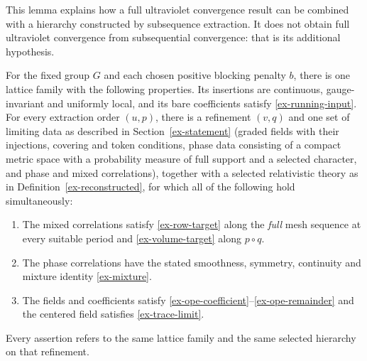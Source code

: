 This lemma explains how a full ultraviolet convergence result can be combined
with a hierarchy constructed by subsequence extraction. It does not obtain
full ultraviolet convergence from subsequential convergence: that is its
additional hypothesis.

\begin{assumption}\label{ex-joint-input}
For the fixed group \(G\) and each chosen positive blocking penalty
\(b\), there is one lattice family with the following properties.
Its insertions are continuous, gauge-invariant and uniformly local, and its
bare coefficients satisfy \eqref{ex-running-input}.
For every extraction order \((u,p)\), there is a refinement \((v,q)\)
and one set of limiting data as described in Section~\ref{ex-statement}
(graded fields with their injections, covering and token conditions, phase
data consisting of a compact metric space with a probability measure of
full support and a selected character, and phase and mixed correlations),
together with a selected relativistic theory as in
Definition~\ref{ex-reconstructed}, for which
all of the following hold simultaneously:
\begin{enumerate}
\item The mixed correlations satisfy \eqref{ex-row-target} along the
\emph{full} mesh sequence at every suitable period and
\eqref{ex-volume-target} along \(p\circ q\).
\item The phase correlations have the stated smoothness, symmetry,
continuity and mixture identity \eqref{ex-mixture}.
\item The fields and coefficients satisfy
\eqref{ex-ope-coefficient}--\eqref{ex-ope-remainder} and the centered
field satisfies \eqref{ex-trace-limit}.
\end{enumerate}
Every assertion refers to the same lattice family and the same selected
hierarchy on that refinement.
\end{assumption}

